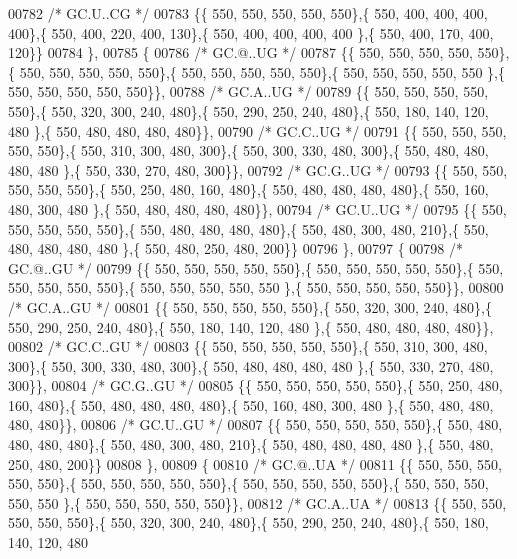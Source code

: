 \begin{DoxyCode}
00782 \textcolor{comment}{/* GC.U..CG */}
00783 \{\{ 550, 550, 550, 550, 550\},\{ 550, 400, 400, 400, 400\},\{ 550, 400, 220, 400, 130\},\{ 550, 400, 400, 400, 400
      \},\{ 550, 400, 170, 400, 120\}\}
00784 \},
00785 \{
00786 \textcolor{comment}{/* GC.@..UG */}
00787 \{\{ 550, 550, 550, 550, 550\},\{ 550, 550, 550, 550, 550\},\{ 550, 550, 550, 550, 550\},\{ 550, 550, 550, 550, 550
      \},\{ 550, 550, 550, 550, 550\}\},
00788 \textcolor{comment}{/* GC.A..UG */}
00789 \{\{ 550, 550, 550, 550, 550\},\{ 550, 320, 300, 240, 480\},\{ 550, 290, 250, 240, 480\},\{ 550, 180, 140, 120, 480
      \},\{ 550, 480, 480, 480, 480\}\},
00790 \textcolor{comment}{/* GC.C..UG */}
00791 \{\{ 550, 550, 550, 550, 550\},\{ 550, 310, 300, 480, 300\},\{ 550, 300, 330, 480, 300\},\{ 550, 480, 480, 480, 480
      \},\{ 550, 330, 270, 480, 300\}\},
00792 \textcolor{comment}{/* GC.G..UG */}
00793 \{\{ 550, 550, 550, 550, 550\},\{ 550, 250, 480, 160, 480\},\{ 550, 480, 480, 480, 480\},\{ 550, 160, 480, 300, 480
      \},\{ 550, 480, 480, 480, 480\}\},
00794 \textcolor{comment}{/* GC.U..UG */}
00795 \{\{ 550, 550, 550, 550, 550\},\{ 550, 480, 480, 480, 480\},\{ 550, 480, 300, 480, 210\},\{ 550, 480, 480, 480, 480
      \},\{ 550, 480, 250, 480, 200\}\}
00796 \},
00797 \{
00798 \textcolor{comment}{/* GC.@..GU */}
00799 \{\{ 550, 550, 550, 550, 550\},\{ 550, 550, 550, 550, 550\},\{ 550, 550, 550, 550, 550\},\{ 550, 550, 550, 550, 550
      \},\{ 550, 550, 550, 550, 550\}\},
00800 \textcolor{comment}{/* GC.A..GU */}
00801 \{\{ 550, 550, 550, 550, 550\},\{ 550, 320, 300, 240, 480\},\{ 550, 290, 250, 240, 480\},\{ 550, 180, 140, 120, 480
      \},\{ 550, 480, 480, 480, 480\}\},
00802 \textcolor{comment}{/* GC.C..GU */}
00803 \{\{ 550, 550, 550, 550, 550\},\{ 550, 310, 300, 480, 300\},\{ 550, 300, 330, 480, 300\},\{ 550, 480, 480, 480, 480
      \},\{ 550, 330, 270, 480, 300\}\},
00804 \textcolor{comment}{/* GC.G..GU */}
00805 \{\{ 550, 550, 550, 550, 550\},\{ 550, 250, 480, 160, 480\},\{ 550, 480, 480, 480, 480\},\{ 550, 160, 480, 300, 480
      \},\{ 550, 480, 480, 480, 480\}\},
00806 \textcolor{comment}{/* GC.U..GU */}
00807 \{\{ 550, 550, 550, 550, 550\},\{ 550, 480, 480, 480, 480\},\{ 550, 480, 300, 480, 210\},\{ 550, 480, 480, 480, 480
      \},\{ 550, 480, 250, 480, 200\}\}
00808 \},
00809 \{
00810 \textcolor{comment}{/* GC.@..UA */}
00811 \{\{ 550, 550, 550, 550, 550\},\{ 550, 550, 550, 550, 550\},\{ 550, 550, 550, 550, 550\},\{ 550, 550, 550, 550, 550
      \},\{ 550, 550, 550, 550, 550\}\},
00812 \textcolor{comment}{/* GC.A..UA */}
00813 \{\{ 550, 550, 550, 550, 550\},\{ 550, 320, 300, 240, 480\},\{ 550, 290, 250, 240, 480\},\{ 550, 180, 140, 120, 480

\end{DoxyCode}
